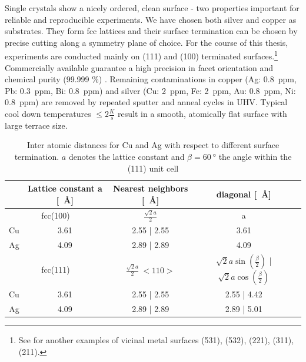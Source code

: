 Single crystals show a nicely ordered, clean surface - two properties important for reliable and reproducible experiments. We have chosen both silver and copper as substrates. They form fcc lattices and their surface termination can be chosen by precise cutting along a symmetry plane of choice. For the course of this thesis, experiments are conducted mainly on (111) and (100) terminated surfaces.\footnote{See \cite{riemann_ionic_2002} for another examples of vicinal metal surfaces (531), (532), (221), (311), (211).} Commercially available guarantee a high precision in facet orientation and chemical purity (99.999 \%) \cite{mateck}. Remaining contaminations in copper (Ag: \SI{0.8}{ppm}, Pb: \SI{0.3}{ppm}, Bi: \SI{0.8}{ppm}) and silver (Cu: \SI{2}{ppm}, Fe: \SI{2}{ppm}, Au: \SI{0.8}{ppm}, Ni: \SI{0.8}{ppm}) are removed by repeated sputter and anneal cycles in UHV. Typical cool down temperatures $\leq 2 \frac{K}{s}$ result in a smooth, atomically flat surface with large terrace size.

\begin{table}
\centering
\caption{Inter atomic distances for Cu and Ag with respect to different surface termination. $a$ denotes the lattice constant and $\beta= \SI{60}{\degree}$ the angle within the (111) unit cell}
  \begin{tabular}{ccccc}
& Lattice constant a [\SI{}{\angstrom}] & Nearest neighbors [\SI{}{\angstrom}] & diagonal [\SI{}{\angstrom}]\\ \hline 
\multicolumn{2}{c}{fcc(100)} & $\frac{\sqrt{2}a}{2}$ & a \\
  Cu	 	& 3.61	& 2.55 | 2.55 & 3.61  \\
  Ag		& 4.09	& 2.89 | 2.89 & 4.09 \\ \hline 
\multicolumn{2}{c}{fcc(111)} & $\frac{\sqrt{2}a}{2} \ <110>$ & $\sqrt{2}a\sin(\frac{\beta}{2})$ | $\sqrt{2}a\cos(\frac{\beta}{2})$\\
Cu 		& 3.61	& 2.55 | 2.55	& 2.55 | 4.42 \\
Ag		& 4.09	& 2.89 | 2.89	& 2.89 | 5.01 \\ \hline
%
 \end{tabular}
\end{table}

